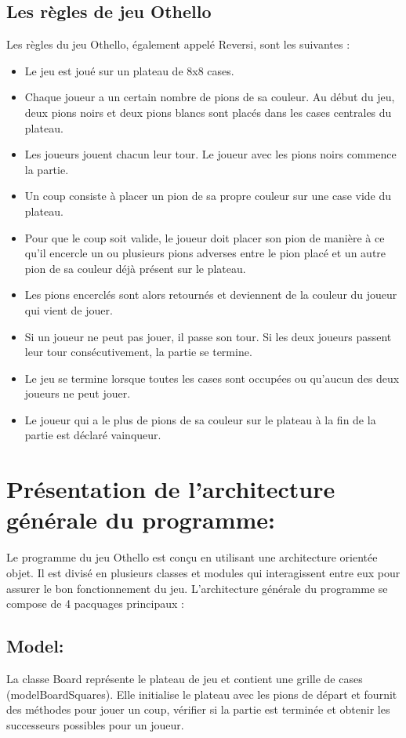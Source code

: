 \documentclass[12pt]{article}
\begin{document}
\subsection{Les règles de jeu Othello}
 Les règles du jeu Othello, également appelé Reversi, sont les suivantes :\\
\begin{itemize}

	
	\item	Le jeu est joué sur un plateau de 8x8 cases.
	\item	Chaque joueur a un certain nombre de pions de sa couleur. Au début du jeu, deux pions noirs et deux pions blancs sont placés dans les cases centrales du plateau.
	\item Les joueurs jouent chacun leur tour. Le joueur avec les pions noirs commence la partie.
		\item Un coup consiste à placer un pion de sa propre couleur sur une case vide du plateau.
		\item Pour que le coup soit valide, le joueur doit placer son pion de manière à ce qu'il encercle un ou plusieurs pions adverses entre le pion placé et un autre pion de sa couleur déjà présent sur le plateau.
 	\item	Les pions encerclés sont alors retournés et deviennent de la couleur du joueur qui vient de jouer.
	\item	Si un joueur ne peut pas jouer, il passe son tour. Si les deux joueurs passent leur tour consécutivement, la partie se termine.
		\item Le jeu se termine lorsque toutes les cases sont occupées ou qu'aucun des deux joueurs ne peut jouer.
	\item	Le joueur qui a le plus de pions de sa couleur sur le plateau à la fin de la partie est déclaré vainqueur.
\end{itemize}
\section{Présentation de l'architecture générale du programme:}
Le programme du jeu Othello est conçu en utilisant une architecture orientée objet. Il est divisé en plusieurs classes et modules qui interagissent entre eux pour assurer le bon fonctionnement du jeu. L'architecture générale du programme se compose de 4 pacquages principaux :

\subsection{Model:}La classe Board représente le plateau de jeu et contient une grille de cases (modelBoardSquares). Elle initialise le plateau avec les pions de départ et fournit des méthodes pour jouer un coup, vérifier si la partie est terminée et obtenir les successeurs possibles pour un joueur.
\end{document}
